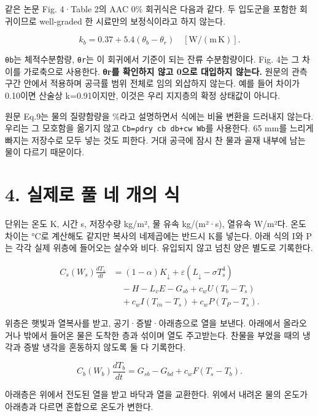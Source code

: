 \documentclass[11pt,a4paper]{article}
\begin{document}
같은 논문 Fig. 4·Table 2의 AAC 0\% 회귀식은 다음과 같다. 두 입도군을 포함한 회귀이므로 well-graded 한 시료만의 보정식이라고 하지 않는다.

\begin{equation*}
k_b = 0.37+5.4(\theta_b-\theta_r)\quad[\mathrm{W/(m\,K)}].\tag{P1}
\end{equation*}

\texttt{θb}는 체적수분함량, \texttt{θr}는 이 회귀에서 기준이 되는 잔류 수분함량이다. Fig. 4는 그 차이를 가로축으로 사용한다. \textbf{θr를 확인하지 않고 0으로 대입하지 않는다.} 원문의 관측 구간 안에서 적용하며 공극률 범위 전체로 임의 외삽하지 않는다. 예를 들어 차이가 0.10이면 산술상 k=0.91이지만, 이것은 우리 지지층의 확정 상태값이 아니다.

원문 Eq.9는 물의 질량함량을 \%라고 설명하면서 식에는 비율 변환을 드러내지 않는다. 우리는 그 모호함을 옮기지 않고 \texttt{Cb=ρdry cb db+cw Wb}를 사용한다. 65 mm를 느리게 빠지는 저장수로 모두 넣는 것도 피한다. 거대 공극에 잠시 찬 물과 골재 내부에 남는 물이 다르기 때문이다.

\section{4. 실제로 풀 네 개의 식}

단위는 온도 K, 시간 s, 저장수량 kg/m², 물 유속 kg/(m²·s), 열유속 W/m²다. 온도 차이는 °C로 계산해도 같지만 복사의 네제곱에는 반드시 K를 넣는다. 아래 식의 I와 P는 각각 실제 위층에 들어오는 살수와 비다. 유입되지 않고 넘친 양은 별도로 기록한다.

\begin{equation*}
\begin{aligned}
C_s(W_s)\frac{dT_s}{dt}
&=(1-\alpha)K_\downarrow+\varepsilon(L_\downarrow-\sigma T_s^4)\\
&\quad-H-L_vE-G_{sb}+c_wU(T_b-T_s)\\
&\quad+c_wI(T_{in}-T_s)+c_wP(T_P-T_s).
\end{aligned}\tag{T1}
\end{equation*}

위층은 햇빛과 열복사를 받고, 공기·증발·아래층으로 열을 보낸다. 아래에서 올라오거나 밖에서 들어온 물은 도착한 층과 섞이며 열도 주고받는다. 찬물을 부었을 때의 냉각과 증발 냉각을 혼동하지 않도록 둘 다 기록한다.

\begin{equation*}
C_b(W_b)\frac{dT_b}{dt}=G_{sb}-G_{bd}+c_wF(T_s-T_b).\tag{T2}
\end{equation*}

아래층은 위에서 전도된 열을 받고 바닥과 열을 교환한다. 위에서 내려온 물의 온도가 아래층과 다르면 혼합으로 온도가 변한다.
\end{document}
